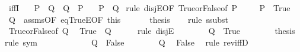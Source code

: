 \begin{isabellebody}
\ iffI{\isacharcolon}{\kern0pt}\isanewline
\ \ \ {\isachardoublequoteopen}P\ {\isasymLongrightarrow}\ Q{\isachardoublequoteclose}\ \ {\isachardoublequoteopen}Q\ {\isasymLongrightarrow}\ P{\isachardoublequoteclose}\isanewline
\ \ \ {\isachardoublequoteopen}P\ {\isacharequal}{\kern0pt}\ Q{\isachardoublequoteclose}\isanewline
%
\isadelimproof
%
\endisadelimproof
%
\isatagproof
{}\isamarkupfalse%
\ {\isacharparenleft}{\kern0pt}rule\ disjE{\isacharbrackleft}{\kern0pt}OF\ True{\isacharunderscore}{\kern0pt}or{\isacharunderscore}{\kern0pt}False{\isacharbrackleft}{\kern0pt}of\ P{\isacharbrackright}{\kern0pt}{\isacharbrackright}{\kern0pt}{\isacharparenright}{\kern0pt}\isanewline
\ \ \isamarkupfalse%
\ {}{\isacharcolon}{\kern0pt}\ {\isachardoublequoteopen}P\ {\isacharequal}{\kern0pt}\ True{\isachardoublequoteclose}\isanewline
\ \ \isamarkupfalse%
\ Q\ {\isacharequal}{\kern0pt}\ assms{\isacharparenleft}{\kern0pt}{}{\isacharparenright}{\kern0pt}{\isacharbrackleft}{\kern0pt}OF\ eqTrueE{\isacharbrackleft}{\kern0pt}OF\ this{\isacharbrackright}{\kern0pt}{\isacharbrackright}{\kern0pt}\isanewline
\ \ \isamarkupfalse%
\ {}\ \isamarkupfalse%
\ {\isacharquery}{\kern0pt}thesis\isanewline
\ \ \isamarkupfalse%
\ {\isacharparenleft}{\kern0pt}rule\ ssubst{\isacharparenright}{\kern0pt}\isanewline
\ \ \ \ \isamarkupfalse%
\ True{\isacharunderscore}{\kern0pt}or{\isacharunderscore}{\kern0pt}False{\isacharbrackleft}{\kern0pt}of\ Q{\isacharbrackright}{\kern0pt}\ \isamarkupfalse%
\ {\isachardoublequoteopen}True\ {\isacharequal}{\kern0pt}\ Q{\isachardoublequoteclose}\isanewline
\ \ \ \ \isamarkupfalse%
\ {\isacharparenleft}{\kern0pt}rule\ disjE{\isacharparenright}{\kern0pt}\isanewline
\ \ \ \ \ \ \isamarkupfalse%
\ {\isachardoublequoteopen}Q\ {\isacharequal}{\kern0pt}\ True{\isachardoublequoteclose}\isanewline
\ \ \ \ \ \ \isamarkupfalse%
\ {\isacharquery}{\kern0pt}thesis\ \isamarkupfalse%
{\isacharparenleft}{\kern0pt}rule\ sym{\isacharparenright}{\kern0pt}\isanewline
\ \ \ \ \isamarkupfalse%
\isanewline
\ \ \ \ \ \ \isamarkupfalse%
\ {\isachardoublequoteopen}Q\ {\isacharequal}{\kern0pt}\ False{\isachardoublequoteclose}\isanewline
\ \ \ \ \ \ \isamarkupfalse%
\ Q\ \isamarkupfalse%
\ False\ \isamarkupfalse%
\ {\isacharparenleft}{\kern0pt}rule\ rev{\isacharunderscore}{\kern0pt}iffD{}{\isacharparenright}{\kern0pt}\isanewline

\end{isabellebody}
